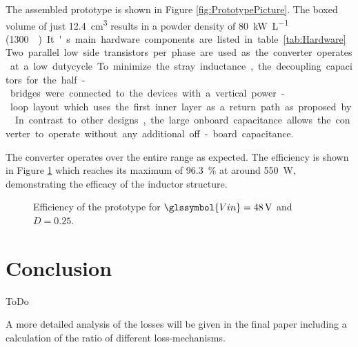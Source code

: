 \documentclass{IPEC2026}
\newcommand{\sbl}[1]{\glssymbol{#1}}
\begin{document}
The assembled prototype is shown in Figure \ref{fig:PrototypePicture}. The boxed volume of just \qty{12.4}{\cubic\cm} results in a powder density of \qty{80}{\kW\per\liter} (\qty{1300}{\W\per\cubic\inch}). It's main hardware components are listed in table \ref{tab:Hardware}. Two parallel low side transistors per phase are used as the converter operates at a low dutycycle. To minimize the stray inductance, the decoupling capacitors for the half-bridges were connected to the devices with a vertical power-loop layout which uses the first inner layer as a return path as proposed by \cite{reuschUnderstandingEffectPCB2014}. In contrast to other designs, the large onboard capacitance allows the converter to operate without any additional off-board capacitance. \par
The converter operates over the entire range as expected. The efficiency is shown in Figure \ref{fig:Efficiency} which reaches its maximum of \qty{96.3}{\percent} at around \qty{550}{\W}, demonstrating the efficacy of the inductor structure.  %

\begin{figure}
  \centering
  
  \caption{Efficiency of the prototype for $\sbl{Vin}=\qty{48}{\V}$ and $D=0.25$.}
  \label{fig:Efficiency}
\end{figure}

\section{Conclusion}
ToDo \par
A more detailed analysis of the losses will be given in the final paper including a calculation of the ratio of different loss-mechanisms.



\end{document}
